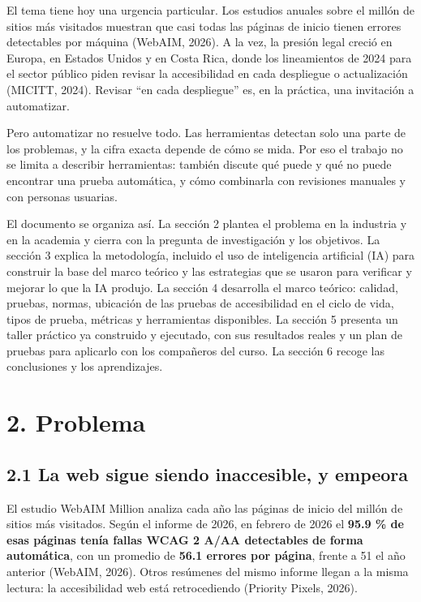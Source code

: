 \documentclass[10pt,letterpaper,onecolumn]{IEEEtran}
\begin{document}
El tema tiene hoy una urgencia particular. Los estudios anuales sobre el millón de sitios más visitados muestran que casi todas las páginas de inicio tienen errores detectables por máquina (WebAIM, 2026). A la vez, la presión legal creció en Europa, en Estados Unidos y en Costa Rica, donde los lineamientos de 2024 para el sector público piden revisar la accesibilidad en cada despliegue o actualización (MICITT, 2024). Revisar ``en cada despliegue'' es, en la práctica, una invitación a automatizar.

Pero automatizar no resuelve todo. Las herramientas detectan solo una parte de los problemas, y la cifra exacta depende de cómo se mida. Por eso el trabajo no se limita a describir herramientas: también discute qué puede y qué no puede encontrar una prueba automática, y cómo combinarla con revisiones manuales y con personas usuarias.

El documento se organiza así. La sección 2 plantea el problema en la industria y en la academia y cierra con la pregunta de investigación y los objetivos. La sección 3 explica la metodología, incluido el uso de inteligencia artificial (IA) para construir la base del marco teórico y las estrategias que se usaron para verificar y mejorar lo que la IA produjo. La sección 4 desarrolla el marco teórico: calidad, pruebas, normas, ubicación de las pruebas de accesibilidad en el ciclo de vida, tipos de prueba, métricas y herramientas disponibles. La sección 5 presenta un taller práctico ya construido y ejecutado, con sus resultados reales y un plan de pruebas para aplicarlo con los compañeros del curso. La sección 6 recoge las conclusiones y los aprendizajes.

\section{2. Problema}\label{problema}

\subsection{2.1 La web sigue siendo inaccesible, y empeora}\label{la-web-sigue-siendo-inaccesible-y-empeora}

El estudio WebAIM Million analiza cada año las páginas de inicio del millón de sitios más visitados. Según el informe de 2026, en febrero de 2026 el \textbf{95.9 \% de esas páginas tenía fallas WCAG 2 A/AA detectables de forma automática}, con un promedio de \textbf{56.1 errores por página}, frente a 51 el año anterior (WebAIM, 2026). Otros resúmenes del mismo informe llegan a la misma lectura: la accesibilidad web está retrocediendo (Priority Pixels, 2026).
\end{document}
